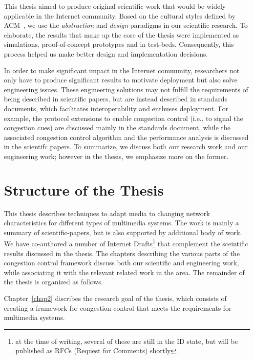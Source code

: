 This thesis aimed to produce original scientific work that would be widely
applicable in the Internet community. Based on the cultural styles defined by
ACM~\cite{Denning:CS.Method}, we use the \textit{abstraction} and
\textit{design} paradigms in our scientific research. To elaborate, the
results that make up the core of the thesis were implemented as simulations,
proof-of-concept prototypes and in test-beds. Consequently, this process
helped us make better design and implementation decisions.

In order to make significant impact in the Internet community, researchers not
only have to produce significant results to motivate deployment but also solve
engineering issues. These engineering solutions may not fulfill the
requirements of being described in scientific papers, but are instead
described in standards documents, which facilitates interoperability and
enthuses deployment. For example, the protocol extensions to enable congestion
control (i.e., to signal the congestion cues) are discussed mainly in the
standards document, while the associated congestion control algorithm and the
performance analysis is discussed in the scientifc papers. To summarize, we
discuss both our research work and our engineering work; however in the
thesis, we emphasize more on the former.



\section{Structure of the Thesis}

This thesis describes techniques to adapt media to changing network
characteristics for different types of multimedia systems. The work is mainly
a summary of scientific-papers, but is also supported by additional body of
work. We have co-authored a number of Internet Drafts\footnote{at the time of
writing, several of these are still in the ID state, but will be published as
RFCs (Request for Comments) shortly} that complement the  sceintific results
discussed in the thesis. The chapters describing the various parts of the
congestion control framework discuss both our scientific and engineering work,
while associating it with the relevant related work in the area. The remainder
of the thesis is organized as follows.

Chapter~\ref{chap2} discribes the research goal of the thesis, which consists
of creating a framework for congestion control that meets the requirements for
multimedia systems.

